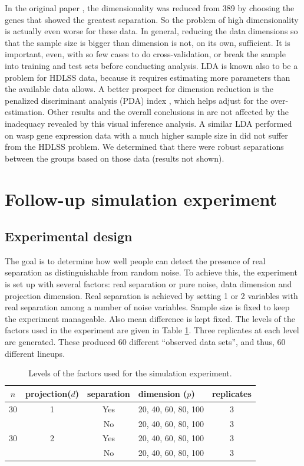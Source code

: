 In the original paper \citep{toth:2010}, the dimensionality was reduced from 389 by choosing the genes that showed the greatest separation. So the problem of high dimensionality is actually even worse for these data. In general, reducing the data dimensions so that the sample size is bigger than dimension is not, on its own, sufficient. It is important, even, with so few cases to do cross-validation, or break the sample into training and test sets before conducting analysis. LDA is known also to be a problem for HDLSS data, because it requires estimating more parameters than the available data allows. A better prospect for dimension reduction is the penalized discriminant analysis (PDA) index \citep{lee:2009}, which helps adjust for the over-estimation. Other results and the overall conclusions in \cite{toth:2010} are not affected by the inadequacy revealed by this visual inference analysis. A similar LDA performed on wasp gene expression data with a much higher sample size in \cite{toth:2007} did not suffer from the HDLSS problem. We determined that there were robust separations between the groups based on those data (results not shown).


\section{Follow-up simulation experiment} \label{sec:experiment}

\subsection{Experimental design}

The goal is to determine how well people can detect the presence of real separation as distinguishable from random noise. To achieve this, the experiment is set up with several factors: real separation or pure noise, data dimension and projection dimension. Real separation is achieved by setting 1 or 2 variables with real separation among a number of noise variables.  Sample size is fixed to keep the experiment manageable. Also mean difference is kept fixed. The levels of the factors used in the experiment are given in Table \ref{freq}. Three replicates at each level are generated. These produced 60 different ``observed data sets'', and thus, 60 different lineups. 

\begin{table}[htbp]
\begin{center}
\caption{Levels of the factors used for the simulation experiment.}
\begin{tabular}{cccp{2.2cm}|c}
  \hline
  \hline
  $n$ & projection($d$) & separation & dimension ($p$) & replicates\\
  \hline
  30 & 1 & Yes & 20, 40, 60, 80, 100 & 3 \\
      & & No & 20, 40, 60, 80, 100 & 3\\
   30 & 2 & Yes & 20, 40, 60, 80, 100 & 3 \\
     & & No & 20, 40, 60, 80, 100 & 3\\   
      \hline
\end{tabular}
\label{freq}
\end{center}
\end{table} 

